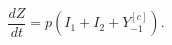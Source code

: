\begin{equation}
	\frac{dZ}{dt} =
		p 
		\left(
			I_1+ I_2 + Y_{-1}^{[c]}
		\right).
\end{equation}
